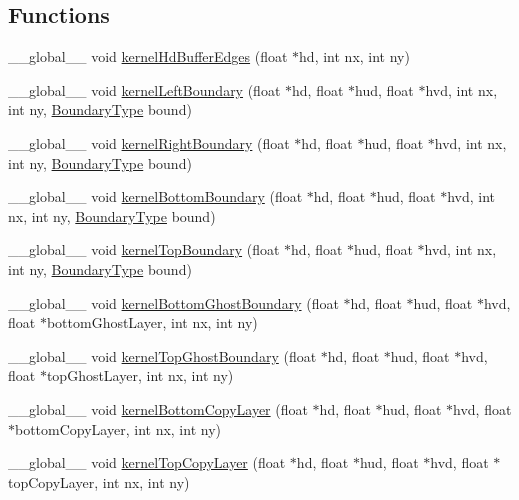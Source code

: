 \subsection*{Functions}
\begin{DoxyCompactItemize}
\item 
\-\_\-\-\_\-global\-\_\-\-\_\- void \hyperlink{SWE__BlockCUDA__kernels_8cu_ad34d42b9197cf6063931cb1bf7c03bd4}{kernel\-Hd\-Buffer\-Edges} (float $\ast$hd, int nx, int ny)
\item 
\-\_\-\-\_\-global\-\_\-\-\_\- void \hyperlink{SWE__BlockCUDA__kernels_8cu_a70e795bea06be7152de387957e090eb3}{kernel\-Left\-Boundary} (float $\ast$hd, float $\ast$hud, float $\ast$hvd, int nx, int ny, \hyperlink{SWE__Scenario_8hh_af75d5dd7322fa39ed0af4e7839e600f8}{Boundary\-Type} bound)
\item 
\-\_\-\-\_\-global\-\_\-\-\_\- void \hyperlink{SWE__BlockCUDA__kernels_8cu_a5b25e2843f0f18a4a5843165ce46054f}{kernel\-Right\-Boundary} (float $\ast$hd, float $\ast$hud, float $\ast$hvd, int nx, int ny, \hyperlink{SWE__Scenario_8hh_af75d5dd7322fa39ed0af4e7839e600f8}{Boundary\-Type} bound)
\item 
\-\_\-\-\_\-global\-\_\-\-\_\- void \hyperlink{SWE__BlockCUDA__kernels_8cu_a776336452fee130d27d02b109a7ab89d}{kernel\-Bottom\-Boundary} (float $\ast$hd, float $\ast$hud, float $\ast$hvd, int nx, int ny, \hyperlink{SWE__Scenario_8hh_af75d5dd7322fa39ed0af4e7839e600f8}{Boundary\-Type} bound)
\item 
\-\_\-\-\_\-global\-\_\-\-\_\- void \hyperlink{SWE__BlockCUDA__kernels_8cu_a655f11967ba2a7ed124b92a9f1400788}{kernel\-Top\-Boundary} (float $\ast$hd, float $\ast$hud, float $\ast$hvd, int nx, int ny, \hyperlink{SWE__Scenario_8hh_af75d5dd7322fa39ed0af4e7839e600f8}{Boundary\-Type} bound)
\item 
\-\_\-\-\_\-global\-\_\-\-\_\- void \hyperlink{SWE__BlockCUDA__kernels_8cu_a899b7431f0cec06555bf3b0d8e848782}{kernel\-Bottom\-Ghost\-Boundary} (float $\ast$hd, float $\ast$hud, float $\ast$hvd, float $\ast$bottom\-Ghost\-Layer, int nx, int ny)
\item 
\-\_\-\-\_\-global\-\_\-\-\_\- void \hyperlink{SWE__BlockCUDA__kernels_8cu_a7cf7164d51b1b16664556c25dd675a46}{kernel\-Top\-Ghost\-Boundary} (float $\ast$hd, float $\ast$hud, float $\ast$hvd, float $\ast$top\-Ghost\-Layer, int nx, int ny)
\item 
\-\_\-\-\_\-global\-\_\-\-\_\- void \hyperlink{SWE__BlockCUDA__kernels_8cu_af1a79800b1a5fca1daaeded30541769b}{kernel\-Bottom\-Copy\-Layer} (float $\ast$hd, float $\ast$hud, float $\ast$hvd, float $\ast$bottom\-Copy\-Layer, int nx, int ny)
\item 
\-\_\-\-\_\-global\-\_\-\-\_\- void \hyperlink{SWE__BlockCUDA__kernels_8cu_a48b8d7d4d3bf3c69a289df057f4b6f3e}{kernel\-Top\-Copy\-Layer} (float $\ast$hd, float $\ast$hud, float $\ast$hvd, float $\ast$top\-Copy\-Layer, int nx, int ny)
\end{DoxyCompactItemize}


